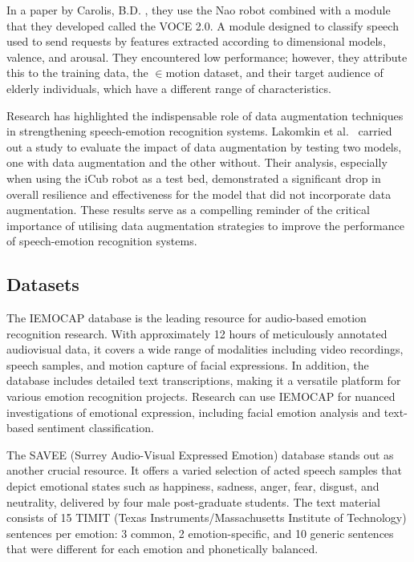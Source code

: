 In a paper by Carolis, B.D. \cite{Carolis2016-ig}, they use the Nao robot combined with a module that they developed called the VOCE 2.0. A module designed to classify speech used to send requests by features extracted according to dimensional models, valence, and arousal. They encountered low performance; however, they attribute this to the training data, the \begin{math} \in{} \end{math}motion dataset, and their target audience of elderly individuals, which have a different range of characteristics.

Research has highlighted the indispensable role of data augmentation techniques in strengthening speech-emotion recognition systems. Lakomkin et al.\ \cite{Lakomkin2018-ws} carried out a study to evaluate the impact of data augmentation by testing two models, one with data augmentation and the other without. Their analysis, especially when using the iCub robot as a test bed, demonstrated a significant drop in overall resilience and effectiveness for the model that did not incorporate data augmentation. These results serve as a compelling reminder of the critical importance of utilising data augmentation strategies to improve the performance of speech-emotion recognition systems.

\subsection{Datasets}

The IEMOCAP database \cite{Busso2008-qj} is the leading resource for audio-based emotion recognition research. With approximately 12 hours of meticulously annotated audiovisual data, it covers a wide range of modalities including video recordings, speech samples, and motion capture of facial expressions. In addition, the database includes detailed text transcriptions, making it a versatile platform for various emotion recognition projects. Research can use IEMOCAP for nuanced investigations of emotional expression, including facial emotion analysis and text-based sentiment classification.

The SAVEE (Surrey Audio-Visual Expressed Emotion) database \cite{HaqJackson_AVSP09} stands out as another crucial resource. It offers a varied selection of acted speech samples that depict emotional states such as happiness, sadness, anger, fear, disgust, and neutrality, delivered by four male post-graduate students. The text material consists of 15 TIMIT (Texas Instruments/Massachusetts Institute of Technology) sentences per emotion: 3 common, 2 emotion-specific, and 10 generic sentences that were different for each emotion and phonetically balanced.

